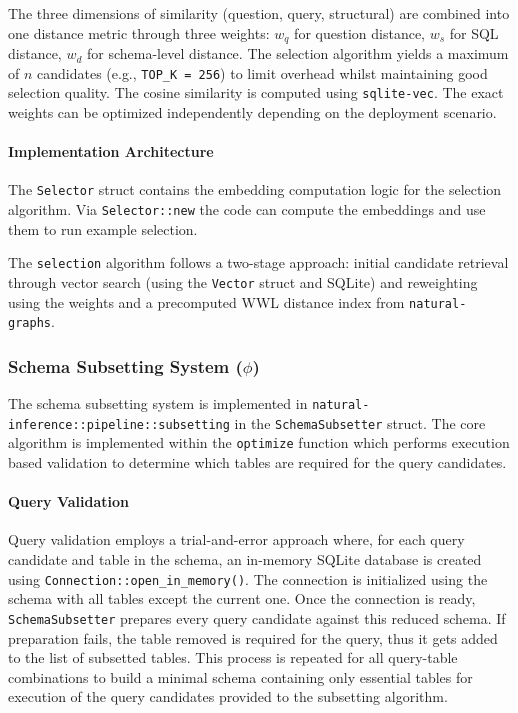 The three dimensions of similarity (question, query, structural) are combined
into one distance metric through three weights: $w_q$ for question distance,
$w_s$ for SQL distance, $w_d$ for schema-level distance. The selection algorithm
yields a maximum of $n$ candidates (e.g., \texttt{TOP\_K = 256}) to limit
overhead whilst maintaining good selection quality. The cosine similarity
is computed using \texttt{sqlite-vec}. The exact weights can be optimized
independently depending on the deployment scenario.

\paragraph{Implementation Architecture}

The \texttt{Selector} struct contains the embedding computation logic for the
selection algorithm. Via \texttt{Selector::new} the code can compute the
embeddings and use them to run example selection.

The \texttt{selection} algorithm follows a two-stage approach: initial
candidate retrieval through vector search (using the \texttt{Vector} struct and
SQLite) and reweighting using the weights and a precomputed WWL distance index
from \texttt{natural-graphs}.

\subsubsection{Schema Subsetting System ($\phi$)}

The schema subsetting system is implemented in
\texttt{natural-inference::pipeline::subsetting} in the
\texttt{SchemaSubsetter} struct. The core algorithm is implemented within the
\texttt{optimize} function which performs execution based validation to
determine which tables are required for the query candidates.

\paragraph{Query Validation}

Query validation employs a trial-and-error approach where, for each query
candidate and table in the schema, an in-memory SQLite database
is created using \texttt{Connection::open\_in\_memory()}. The
connection is initialized using the schema with all tables except
the current one. Once the connection is ready, \texttt{SchemaSubsetter}
prepares every query candidate against this reduced schema. If preparation
fails, the table removed is required for the query, thus it gets added to the
list of subsetted tables. This process is repeated for all query-table
combinations to build a minimal schema containing only essential tables for
execution of the query candidates provided to the subsetting algorithm.

